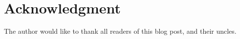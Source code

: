 \section*{Acknowledgment}

The author would like to thank all readers of this blog post, and their uncles.
